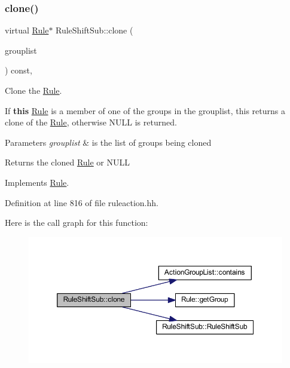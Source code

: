 \subsubsection{\texorpdfstring{clone()}{clone()}}
{\footnotesize\ttfamily virtual \mbox{\hyperlink{class_rule}{Rule}}$\ast$ Rule\+Shift\+Sub\+::clone (\begin{DoxyParamCaption}\item[{const \mbox{\hyperlink{class_action_group_list}{Action\+Group\+List}} \&}]{grouplist }\end{DoxyParamCaption}) const\hspace{0.3cm}{\ttfamily [inline]}, {\ttfamily [virtual]}}



Clone the \mbox{\hyperlink{class_rule}{Rule}}. 

If {\bfseries{this}} \mbox{\hyperlink{class_rule}{Rule}} is a member of one of the groups in the grouplist, this returns a clone of the \mbox{\hyperlink{class_rule}{Rule}}, otherwise N\+U\+LL is returned. 
\begin{DoxyParams}{Parameters}
{\em grouplist} & is the list of groups being cloned \\
\hline
\end{DoxyParams}
\begin{DoxyReturn}{Returns}
the cloned \mbox{\hyperlink{class_rule}{Rule}} or N\+U\+LL 
\end{DoxyReturn}


Implements \mbox{\hyperlink{class_rule_a70de90a76461bfa7ea0b575ce3c11e4d}{Rule}}.



Definition at line 816 of file ruleaction.\+hh.

Here is the call graph for this function\+:
\nopagebreak
\begin{figure}[H]
\begin{center}
\leavevmode
\includegraphics[width=350pt]{class_rule_shift_sub_acc0a74c73acbe73c52f554e527d0eccb_cgraph}
\end{center}
\end{figure}
\mbox{\label{class_rule_shift_sub_a75979972410e1b852639aa2ffafccc1e}} 

